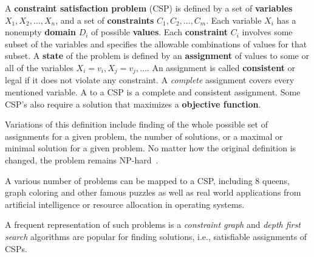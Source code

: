 \begin{definition}\cite{csp}
A \textbf{constraint satisfaction problem} (CSP) is defined by a set of \textbf{variables} $X_1, X_2, \ldots, X_n$, and a set of \textbf{constraints} $C_1, C_2, \ldots, C_m$. Each variable $X_i$ has a nonempty \textbf{domain} $D_i$ of possible \textbf{values}. Each \textbf{constraint} $C_i$ involves some subset of the variables and specifies the allowable combinations of values for that subset. A \textbf{state} of the problem is defined by an \textbf{assignment} of values to some or all of the variables ${X_i = v_i, X_j = v_j, \ldots}$. An assignment is called \textbf{consistent} or legal if it does not violate any constraint. A \emph{complete} assignment covers every mentioned variable. A  to a CSP is a complete and consistent assignment. Some CSP's also require a solution that maximizes a \textbf{objective function}.
\end{definition}

Variations of this definition include finding of the whole possible set of assignments for a given problem, the number of solutions, or a maximal or minimal solution for a given problem. No matter how the original definition is changed, the problem remains NP-hard~\cite{csp}.

A various number of problems can be mapped to a CSP, including 8 queens, graph coloring and other famous puzzles as well as real world applications from artificial intelligence or resource allocation in operating systems. 

A frequent representation of such problems is a \emph{constraint graph} and \emph{depth first search} algorithms are popular for finding solutions, i.e., satisfiable assignments of CSPs. 

